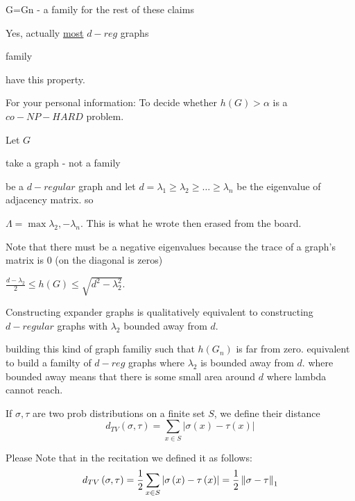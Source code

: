 \begin{insight}
G=Gn - a family for the rest of these claims%
\end{insight}

\begin{thm}
\begin{insight}
\end{insight}
Yes, actually \uline{most} $d-reg$ graphs %
\begin{insight}
family%
\end{insight}
{} have this property.
\end{thm}

For your personal information: To decide whether $h\left(G\right)>\alpha$
is a $co-NP-HARD$ problem.
\begin{thm}
Let $G$ %
\begin{insight}
take a graph - not a family%
\end{insight}
{} be a $d-regular$ graph and let $d=\lambda_{1}\ge\lambda_{2}\ge\dots\ge\lambda_{n}$
be the eigenvalue of adjacency matrix. so %
\begin{insight}
$\Lambda=\max\lambda_{2},-\lambda_{n}$. This is what he wrote then
erased from the board.%
\end{insight}
{} %
\begin{insight}
Note that there must be a negative eigenvalues because the trace of
a graph's matrix is $0$ (on the diagonal is zeros)%
\end{insight}
{} $\frac{d-\lambda_{2}}{2}\le h\left(G\right)\le\sqrt{d^{2}-\lambda_{2}^{2}}$.
\end{thm}

Constructing expander graphs is qualitatively equivalent to constructing
$d-regular$ graphs with $\lambda_{2}$ bounded away from $d$. %
\begin{insight}
building this kind of graph familiy such that $h\left(G_{n}\right)$
is far from zero. equivalent to build a familty of $d-reg$ graphs
where $\lambda_{2}$ is bounded away from $d$. where bounded away
means that there is some small area around $d$ where lambda cannot
reach.%
\end{insight}

\begin{definition}
If $\sigma,\tau$ are two prob distributions on a finite set $S$,
we define their distance 
\[
d_{TV}\left(\sigma,\tau\right)=\sum_{x\in S}\left|\sigma\left(x\right)-\tau\left(x\right)\right|
\]

Please Note that in the recitation we defined it as follows:
\[
d_{TV}\left(\sigma,\tau\right)=\frac{1}{2}\sum_{x\in S}\left|\sigma\left(x\right)-\tau\left(x\right)\right|=\frac{1}{2}\left\Vert \sigma-\tau\right\Vert_{1}
\]
\end{definition}

